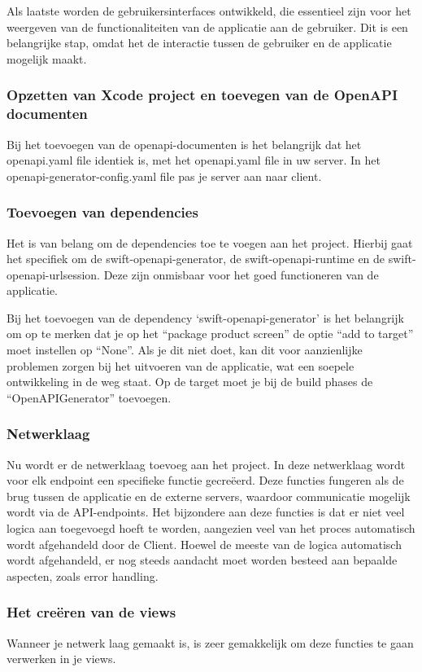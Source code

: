 Als laatste worden de gebruikersinterfaces ontwikkeld, die essentieel zijn voor het weergeven van de functionaliteiten van de applicatie aan de gebruiker. Dit is een belangrijke stap, omdat het de interactie tussen de gebruiker en de applicatie mogelijk maakt.

\subsubsection{Opzetten van Xcode project en toevegen van de OpenAPI documenten}
Bij het toevoegen van de openapi-documenten is het belangrijk dat het openapi.yaml file identiek is, met het openapi.yaml file in uw server. In het openapi-generator-config.yaml file pas je server aan naar client. 

\subsubsection{Toevoegen van dependencies}
Het is van belang om de dependencies toe te voegen aan het project. Hierbij gaat het specifiek om de swift-openapi-generator, de swift-openapi-runtime en de swift-openapi-urlsession. Deze zijn onmisbaar voor het goed functioneren van de applicatie.

Bij het toevoegen van de dependency ‘swift-openapi-generator’ is het belangrijk om op te merken dat je op het “package product screen” de optie “add to target” moet instellen op “None”. Als je dit niet doet, kan dit voor aanzienlijke problemen zorgen bij het uitvoeren van de applicatie, wat een soepele ontwikkeling in de weg staat. Op de target moet je bij de build phases de “OpenAPIGenerator” toevoegen. 


\subsubsection{Netwerklaag}
Nu wordt er de netwerklaag toevoeg aan het project. In deze netwerklaag wordt voor elk endpoint een specifieke functie gecreëerd. Deze functies fungeren als de brug tussen de applicatie en de externe servers, waardoor communicatie mogelijk wordt via de API-endpoints. Het bijzondere aan deze functies is dat er niet veel logica aan toegevoegd hoeft te worden, aangezien veel van het proces automatisch wordt afgehandeld door de Client. 
Hoewel de meeste van de logica automatisch wordt afgehandeld, er nog steeds aandacht moet worden besteed aan bepaalde aspecten, zoals error handling. 

\subsubsection{Het creëren van de views}
Wanneer je netwerk laag gemaakt is, is zeer gemakkelijk om deze functies te gaan verwerken in je views. 